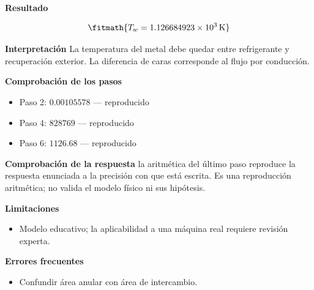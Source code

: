 \documentclass[10pt,openany]{book}
\begin{document}
\begin{tcolorbox}[title={Problema resuelto 1}, studiumworked, breakable]
\noindent\textbf{Resultado}

\[
\fitmath{T_w=1.126684923\times10^{3}\,\mathrm{K}}
\]

\noindent\textbf{Interpretación}
La temperatura del metal debe quedar entre refrigerante y recuperación exterior. La diferencia de caras corresponde al flujo por conducción.

\noindent\textbf{Comprobación de los pasos}
\begin{itemize}
\item Paso 2: $0.00105578$ — reproducido
\item Paso 4: $828769$ — reproducido
\item Paso 6: $1126.68$ — reproducido
\end{itemize}

\noindent\textbf{Comprobación de la respuesta} la aritmética del último paso reproduce la respuesta enunciada a la precisión con que está escrita. Es una reproducción aritmética; no valida el modelo físico ni sus hipótesis.

\noindent\textbf{Limitaciones}
\begin{itemize}
\item Modelo educativo; la aplicabilidad a una máquina real requiere revisión experta.
\end{itemize}

\noindent\textbf{Errores frecuentes}
\begin{itemize}
\item Confundir área anular con área de intercambio.
\end{itemize}
\end{tcolorbox}
\end{document}
